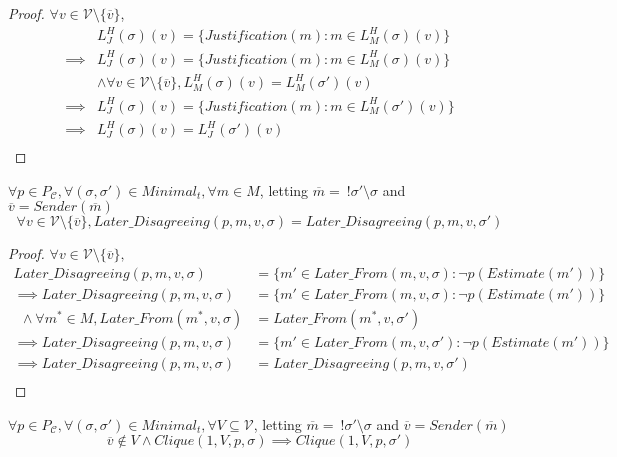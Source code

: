 \begin{proof}
  $\forall v \in \mathcal{V} \setminus \{\overline{v}\}$,
  \begin{align}
            &L^H_J(\sigma)(v) = \{Justification(m) : m \in L^H_M(\sigma)(v)\} \\
    \implies&L^H_J(\sigma)(v) = \{Justification(m) : m \in L^H_M(\sigma)(v)\} \\
            &\land \forall v \in \mathcal{V} \setminus \{\overline{v}\}, L^H_M(\sigma)(v) = L^H_M(\sigma')(v) \\
    \implies&L^H_J(\sigma)(v) = \{Justification(m) : m \in L^H_M(\sigma')(v)\} \\
    \implies&L^H_J(\sigma)(v) = L^H_J(\sigma')(v) \\
  \end{align}
\end{proof}



\begin{lemma}
$\forall p \in P_{\mathcal{C}}, \forall (\sigma, \sigma') \in Minimal_t, \forall m \in M$, letting $\overline{m} =~!\sigma'\setminus\sigma$ and $\overline{v} = Sender(\overline{m})$
$$
\forall v \in \mathcal{V} \setminus \{\overline{v}\}, Later\_Disagreeing(p, m, v, \sigma) = Later\_Disagreeing(p, m, v, \sigma')
$$
\end{lemma}

\begin{proof}
$\forall v \in \mathcal{V} \setminus \{\overline{v}\},$
\begin{align}
Later\_Disagreeing(p, m, v, \sigma) &= \{m' \in Later\_From(m, v, \sigma) : \neg p(Estimate(m')) \} \\
\implies Later\_Disagreeing(p, m, v, \sigma) &= \{m' \in Later\_From(m, v, \sigma) : \neg p(Estimate(m')) \} \\
~~\land \forall m^* \in M, Later\_From(m^*,v,\sigma) &= Later\_From(m^*,v,\sigma') \\
\implies Later\_Disagreeing(p, m, v, \sigma) &= \{m' \in Later\_From(m, v, \sigma') : \neg p(Estimate(m')) \} \\
\implies Later\_Disagreeing(p, m, v, \sigma) &= Later\_Disagreeing(p, m, v, \sigma') \\
\end{align}
\end{proof}

\begin{lemma}
$\forall p \in P_{\mathcal{C}}, \forall (\sigma, \sigma') \in Minimal_t, \forall V \subseteq \mathcal{V}$, letting $\overline{m} =~!\sigma'\setminus\sigma$ and $\overline{v} = Sender(\overline{m})$
$$
\overline{v} \notin V \land Clique(1, V, p, \sigma) \implies Clique(1, V, p, \sigma')
$$
\end{lemma}

